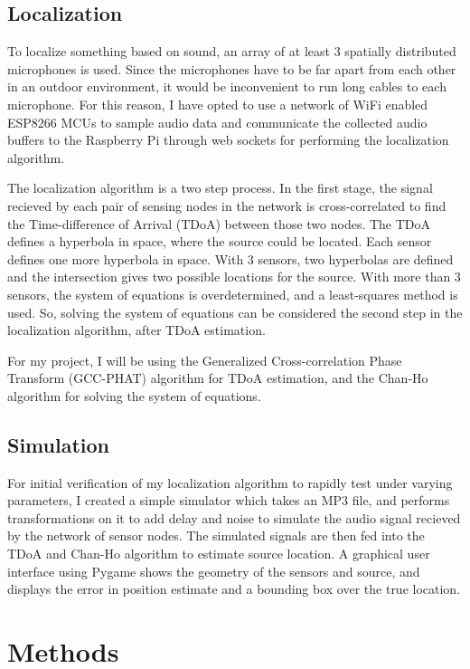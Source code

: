\documentclass[12pt]{article}
\begin{document}
\subsection{Localization}
To localize something based on sound, an array of at least 3 spatially distributed microphones is used. Since the microphones have to be far apart from each other in an outdoor environment, it would be inconvenient to run long cables to each microphone. For this reason, I have opted to use a network of WiFi enabled ESP8266 MCUs to sample audio data and communicate the collected audio buffers to the Raspberry Pi through web sockets for performing the localization algorithm.

The localization algorithm is a two step process. In the first stage, the signal recieved by each pair of sensing nodes in the network is cross-correlated to find the Time-difference of Arrival (TDoA) between those two nodes. The TDoA defines a hyperbola in space, where the source could be located. Each sensor defines one more hyperbola in space. With 3 sensors, two hyperbolas are defined and the intersection gives two possible locations for the source. With more than 3 sensors, the system of equations is overdetermined, and a least-squares method is used. So, solving the system of equations can be considered the second step in the localization algorithm, after TDoA estimation.

For my project, I will be using the Generalized Cross-correlation Phase Transform (GCC-PHAT) algorithm for TDoA estimation, and the Chan-Ho algorithm for solving the system of equations.

\subsection{Simulation}
For initial verification of my localization algorithm to rapidly test under varying parameters, I created a simple simulator which takes an MP3 file, and performs transformations on it to add delay and noise to simulate the audio signal recieved by the network of sensor nodes. The simulated signals are then fed into the TDoA and Chan-Ho algorithm to estimate source location. A graphical user interface using Pygame shows the geometry of the sensors and source, and displays the error in position estimate and a bounding box over the true location.

\section{Methods}\label{sec:methods}
\end{document}
